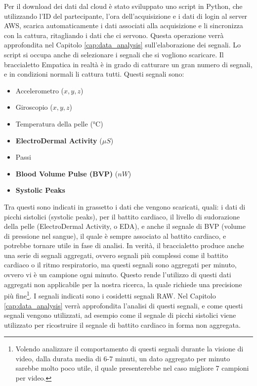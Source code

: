 Per il download dei dati dal cloud è stato sviluppato uno script in Python, che utilizzando l'ID del partecipante, l'ora dell'acquisizione e i dati di login al server AWS, scarica automaticamente i dati associati alla acquisizione e li sincronizza con la cattura, ritagliando i dati che ci servono. Questa operazione verrà approfondita nel Capitolo \ref{cap:data_analysis} sull'elaborazione dei segnali. Lo script si occupa anche di selezionare i segnali che si vogliono scaricare. Il braccialetto Empatica in realtà è in grado di catturare un gran numero di segnali, e in condizioni normali li cattura tutti. Questi segnali sono:
\begin{itemize}
    \item Accelerometro ($x,y,z$)
    \item Giroscopio ($x,y,z$)
    \item Temperatura della pelle (°C)
    \item \textbf{ElectroDermal Activity} ($\mu S$)
    \item Passi
    \item \textbf{Blood Volume Pulse (BVP)} ($nW$)
    \item \textbf{Systolic Peaks}
\end{itemize}
Tra questi sono indicati in grassetto i dati che vengono scaricati, quali: i dati di picchi sistolici (systolic peaks), per il battito cardiaco, il livello di sudorazione della pelle (ElectroDermal Activity, o EDA), e anche il segnale di BVP (volume di pressione nel sangue), il quale è sempre associato al battito cardiaco, e potrebbe tornare utile in fase di analisi. In verità, il braccialetto produce anche una serie di segnali aggregati, ovvero segnali più complessi come il battito cardiaco o il ritmo respiratorio, ma questi segnali sono aggregati per minuto, ovvero vi è un campione ogni minuto. Questo rende l'utilizzo di questi dati aggregati non applicabile per la nostra ricerca, la quale richiede una precisione più fine\footnote{Volendo analizzare il comportamento di questi segnali durante la visione di video, dalla durata media di 6-7 minuti, un dato aggregato per minuto sarebbe molto poco utile, il quale presenterebbe nel caso migliore 7 campioni per video.}. I segnali indicati sono i cosidetti segnali RAW. Nel Capitolo \ref{cap:data_analysis} verrà approfondita l'analisi di questi segnali, e come questi segnali vengono utilizzati, ad esempio come il segnale di picchi sistolici viene utilizzato per ricostruire il segnale di battito cardiaco in forma non aggregata.

\clearpage